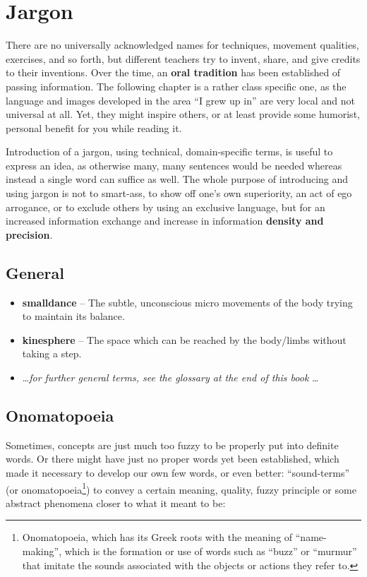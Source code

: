 \chapter{Jargon}\label{ch:jargon}


There are no universally acknowledged names for techniques, movement qualities, exercises, and so forth, but different teachers try to invent, share, and give credits to their inventions.
Over the time, an \textbf{oral tradition} has been established of passing information.
The following chapter is a rather class specific one, as the language and images developed in the area ``I grew up in'' are very local and not universal at all.
Yet, they might inspire others, or at least provide some humorist, personal benefit for you while reading it.

Introduction of a jargon, using technical, domain-specific terms, is useful to express an idea, as otherwise many, many sentences would be needed whereas instead a single word can suffice as well.
The whole purpose of introducing and using jargon is not to smart-ass, to show off one's own superiority, an act of ego arrogance, or to exclude others by using an exclusive language, but for an increased information exchange and increase in information \textbf{density and precision}.

\section{General}\label{sec:general}

\begin{itemize}
    \item [] \textbf{\Gls{smalldance}} -- The subtle, unconscious micro movements of the body trying to maintain its balance.
    \item [] \textbf{\Gls{kinesphere}} -- The space which can be reached by the body/limbs without taking a step.
    \item [] \ldots \textit{for further general terms, see the glossary at the end of this book} \ldots
\end{itemize}

\section{Onomatopoeia}\label{sec:onomatopoeia}

Sometimes, concepts are just much too fuzzy to be properly put into definite words.
Or there might have just no proper words yet been established, which made it necessary to develop our own few words, or even better: ``sound-terms'' (or onomatopoeia\footnote{Onomatopoeia, which has its Greek roots with the meaning of ``name-making'', which is the formation or use of words such as ``buzz'' or ``murmur'' that imitate the sounds associated with the objects or actions they refer to.}) to convey a certain meaning, quality, fuzzy principle or some abstract phenomena closer to what it meant to be:

